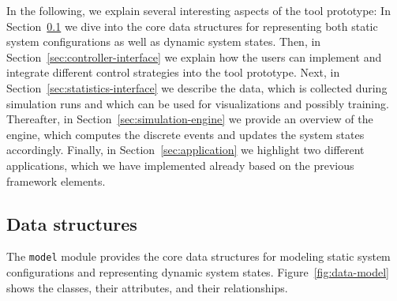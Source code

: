 \documentclass[a4paper,twoside]{article}
\begin{document}
	In the following, we explain several interesting aspects of the tool prototype:
	In Section~\ref{sec:data-model} we dive into the core data structures for representing both static system configurations as well as dynamic system states.
	Then, in Section~\ref{sec:controller-interface} we explain how the users can implement and integrate different control strategies into the tool prototype.
	Next, in Section~\ref{sec:statistics-interface} we describe the data, which is collected during simulation runs and which can be used for visualizations and possibly training.
	Thereafter, in Section~\ref{sec:simulation-engine} we provide an overview of the engine, which computes the discrete events and updates the system states accordingly.
	Finally, in Section~\ref{sec:application} we highlight two different applications, which we have implemented already based on the previous framework elements.
	
	
	
	
	\subsection{Data structures}
	\label{sec:data-model}
	
	The \texttt{model} module provides the core data structures for modeling static system configurations and representing dynamic system states.
	Figure~\ref{fig:data-model} shows the classes, their attributes, and their relationships.
	
\end{document}
